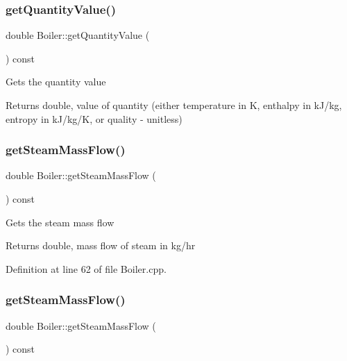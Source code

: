 \subsubsection{\texorpdfstring{get\+Quantity\+Value()}{getQuantityValue()}\hspace{0.1cm}{\footnotesize\ttfamily [3/3]}}
{\footnotesize\ttfamily double Boiler\+::get\+Quantity\+Value (\begin{DoxyParamCaption}{ }\end{DoxyParamCaption}) const}

Gets the quantity value \begin{DoxyReturn}{Returns}
double, value of quantity (either temperature in K, enthalpy in k\+J/kg, entropy in k\+J/kg/K, or quality -\/ unitless) 
\end{DoxyReturn}
\mbox{\label{class_boiler_a4101e71234995558a451dcab145b5fc9}} 
\subsubsection{\texorpdfstring{get\+Steam\+Mass\+Flow()}{getSteamMassFlow()}\hspace{0.1cm}{\footnotesize\ttfamily [1/3]}}
{\footnotesize\ttfamily double Boiler\+::get\+Steam\+Mass\+Flow (\begin{DoxyParamCaption}{ }\end{DoxyParamCaption}) const}

Gets the steam mass flow \begin{DoxyReturn}{Returns}
double, mass flow of steam in kg/hr 
\end{DoxyReturn}


Definition at line 62 of file Boiler.\+cpp.

\mbox{\label{class_boiler_a4101e71234995558a451dcab145b5fc9}} 
\subsubsection{\texorpdfstring{get\+Steam\+Mass\+Flow()}{getSteamMassFlow()}\hspace{0.1cm}{\footnotesize\ttfamily [2/3]}}
{\footnotesize\ttfamily double Boiler\+::get\+Steam\+Mass\+Flow (\begin{DoxyParamCaption}{ }\end{DoxyParamCaption}) const}

